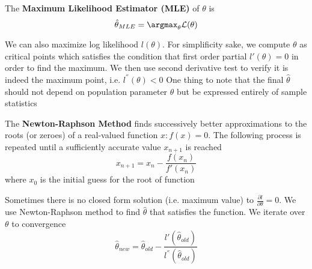 \documentclass[11pt]{article}
\begin{document}
\begin{defn*}
  The \textbf{Maximum Likelihood Estimator (MLE)} of $\theta$ is
  \[
    \hat{\theta}_{MLE} = \argmax_{\theta} \mathcal{L}(\theta)
  \]
  \begin{rem}
    We can also maximize log likelihood $l(\theta)$. For simplificity sake, we compute $\theta$ as critical points which satisfies the condition that first order partial $l'(\theta) = 0$ in order to find the maximum. We then use second derivative test to verify it is indeed the maximum point, i.e. $l^{''}(\theta) < 0$ One thing to note that the final $\hat{\theta}$ should not depend on population parameter $\theta$ but be expressed entirely of sample statistics
  \end{rem}
\end{defn*}




\begin{defn*}
  The \textbf{Newton-Raphson Method} finds successively better approximations to the roots (or zeroes) of a real-valued function $x: f(x) = 0$. The following process is repeated until a sufficiently accurate value $x_{n+1}$ is reached
  \[
    x_{n+1} = x_{n} - \frac{f(x_n)}{f'(x_n)}
  \]
  where $x_0$ is the initial guess for the root of function
  \begin{rem}
    Sometimes there is no closed form solution (i.e. maximum value) to $\frac{\partial l}{\partial \theta} = 0$. We use Newton-Raphson method to find $\hat{\theta}$ that satisfies the function. We iterate over $\theta$ to convergence
    \[
      \hat{\theta}_{new} = \hat{\theta}_{old} - \frac{l'(\hat{\theta}_{old})}{l^{''}(\hat{\theta}_{old})}
    \]
  \end{rem}
\end{defn*}
\end{document}
